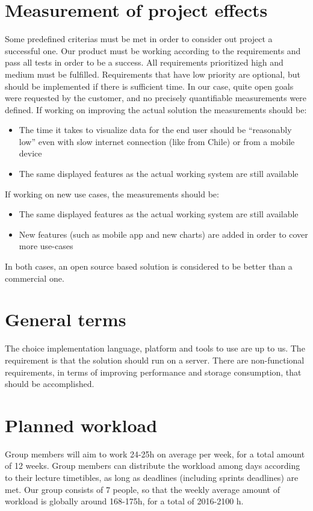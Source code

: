 \documentclass[11pt,a4paper,titlepage,oneside]{report}
\begin{document}
\section{Measurement of project effects}
Some predefined criterias must be met in order to consider out project a successful one. Our product must be working according to the requirements and pass all tests in order to be a success. All requirements prioritized high and medium must be fulfilled. Requirements that have low priority are optional, but should be implemented if there is sufficient time.
In our case, quite open goals were requested by the customer, and no precisely quantifiable measurements were defined.
If working on improving the actual solution the measurements should be:
\begin{itemize}
\item The time it takes to visualize data for the end user should be “reasonably low” even with slow internet connection (like from Chile) or from a mobile device
\item The same displayed features as the actual working system are still available
\end{itemize}
If working on new use cases, the measurements should be:
\begin{itemize}
\item The same displayed features as the actual working system are still available
\item New features (such as mobile app and new charts) are added in order to cover more use-cases 
\end{itemize}
In both cases, an open source based solution is considered to be better than a commercial one.

\section{General terms}
The choice implementation language, platform and tools to use are up to us. The requirement is that the solution should run on a server.
There are non-functional requirements, in terms of improving performance and storage consumption, that should be accomplished.

\section{Planned workload}
Group members will aim to work 24-25h on average per week, for a total amount of 12 weeks. Group members can distribute the workload among days according to their lecture timetibles, as long as deadlines (including sprints deadlines) are met.
Our group consists of 7 people, so that the weekly average amount of workload is globally around 168-175h, for a total of 2016-2100 h.
\end{document}
